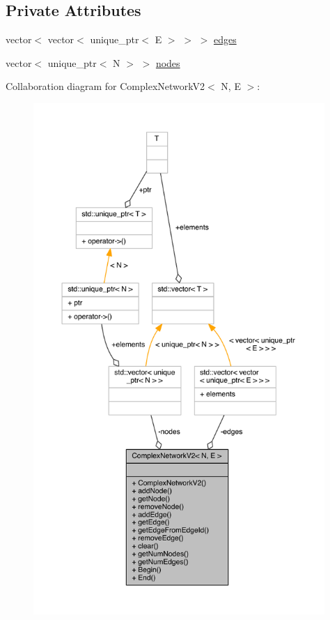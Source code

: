 \subsection*{Private Attributes}
\begin{DoxyCompactItemize}
\item 
vector$<$ vector$<$ unique\+\_\+ptr$<$ E $>$ $>$ $>$ \hyperlink{class_complex_network_v2_acc11e6426cbfd381b54ee764dd6846df}{edges}
\item 
vector$<$ unique\+\_\+ptr$<$ N $>$ $>$ \hyperlink{class_complex_network_v2_a8b02e8553951e064475a31e5e01c9186}{nodes}
\end{DoxyCompactItemize}


Collaboration diagram for Complex\+Network\+V2$<$ N, E $>$\+:\nopagebreak
\begin{figure}[H]
\begin{center}
\leavevmode
\includegraphics[height=550pt]{class_complex_network_v2__coll__graph}
\end{center}
\end{figure}


